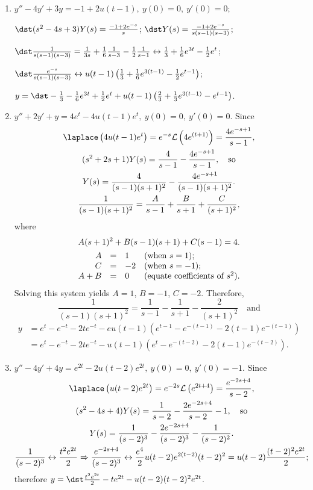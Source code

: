 \documentclass[openany]{book}
\newenvironment{sectionSolutions}{
 \begin{enumerate}[item-label={\thesection.\arabic{enumi}.}]
}{
 \end{enumerate}
}
\begin{document}
\begin{sectionSolutions}
\item
 $y''-4y'+3y=-1+2u(t-1),\ y(0)=0,\ y'(0)=0$;

$\dst(s^2-4s+3)Y(s)=\frac{-1+2e^{-s}}{ s}$;
$\dst Y(s)=\frac{-1+2e^{-s}}{ s(s-1)(s-3)}$;

$\dst\frac{1}{ s(s-1)(s-3)}=\frac{1}{3s}+\frac{1}{6}\frac{1}{
s-3}-\frac{1}{2}\frac{1}{ s-1}
\leftrightarrow \frac{1}{3}+\frac{1}{6}e^{3t}-\frac{1}{2}e^t$;

$\dst\frac{e^{-s}}{ s(s-1)(s-3)}
\leftrightarrow u(t-1)\left(
\frac{1}{3}+\frac{1}{6}e^{3(t-1)}-\frac{1}{2}e^{t-1}\right)$;

$y=\dst-\frac{1}{3}-\frac{1}{6}e^{3t}
+\frac{1}{2}e^t+u(t-1)\left(\frac{2}{3}+\frac{1}{3}e^{3(t-1)}
-e^{t-1}\right)$.



\item
 $y''+2y'+y=4e^t-4u(t-1)e^t,\ y(0)=0,\ y'(0)=0$. Since
\begin{gather*}
\laplace \left(4u(t-1)e^t\right)=e^{-s}{\cal
L}\left(4e^{(t+1)}\right)=\frac{4e^{-s+1}}{ s-1},
\\
(s^2+2s+1)Y(s)=\frac{4}{ s-1}-\frac{4e^{-s+1}}{ s-1},\quad\text{so}
\\
Y(s)=\frac{4}{(s-1)(s+1)^2}-\frac{4e^{-s+1}}{(s-1)(s+1)^2}.
\\
\frac{1}{(s-1)(s+1)^2}=\frac{A}{ s-1}+\frac{B}{ s+1}+
\frac{C}{(s+1)^2},
\end{gather*}
where
\begin{gather*}
A(s+1)^2+B(s-1)(s+1)+C(s-1)=4.
\\
\begin{array}{rc ll}
A&=&1&(\text{when }s=1);\\
C&=&-2&(\text{when }s=-1);\\
A+B&=&0&(\text{equate coefficients of }s^2).
\end{array}
\end{gather*}
Solving this system yields $A=1$, $B=-1$, $C=-2$. Therefore,
\[
\frac{1}{(s-1)(s+1)^2}=\frac{1}{ s-1}-\frac{1}{ s+1}-
\frac{2}{(s+1)^2}\quad\text{and}
\]
\begin{align*}
y&=e^t-e^{-t}-2te^{-t}-eu(t-1)\left(e^{t-1}-e^{-(t-1)}-
2(t-1)e^{-(t-1)}\right)\\
&=e^t-e^{-t}-2te^{-t}-u(t-1)\left(e^t-e^{-(t-2)}-2(t-1)e^{-(t-2)}\right).
\end{align*}


\item
 $y''-4y'+4y=e^{2t}-2u(t-2)e^{2t},\ y(0)=0,\ y'(0)=-1$.
Since
\begin{gather*}
\laplace \left(u(t-2)e^{2t}\right)=e^{-2s}{\cal
L}\left(e^{2t+4}\right)=\frac{e^{-2s+4}}{ s-2},
\\
(s^2-4s+4)Y(s)=\frac{1}{ s-2}-\frac{2e^{-2s+4}}{ s-2}-1,\quad\text{so}
\\
Y(s)=\frac{1}{(s-2)^3}-\frac{2e^{-2s+4}}{(s-2)^3}-\frac{1}{(s-2)^2}.
\\
\frac{1}{(s-2)^3}\leftrightarrow \frac{t^2e^{2t}}{2}\Rightarrow
\frac{e^{-2s+4}}{(s-2)^3}\leftrightarrow\frac{e^4}{2}u(t-2)e^{2(t-2)}(t-2)^2
=u(t-2)\frac{(t-2)^2e^{2t}}{2};
\end{gather*}
therefore
$y=\dst\frac{t^2e^{2t}}{2}-te^{2t}-u(t-2)(t-2)^2e^{2t}$.



\end{sectionSolutions}
\end{document}
